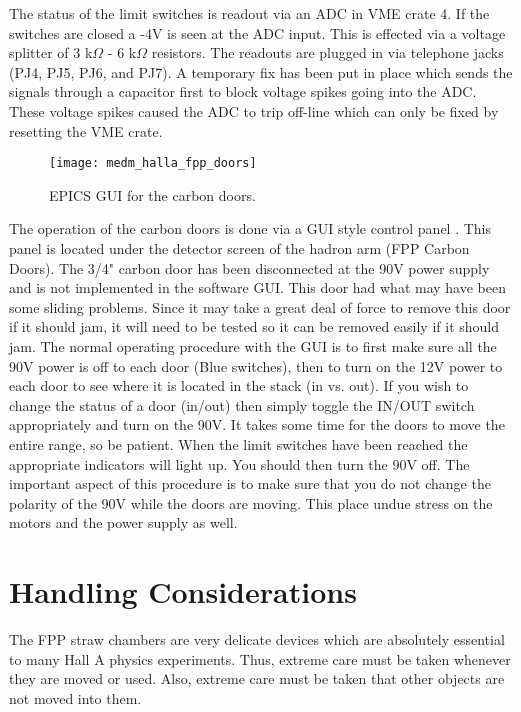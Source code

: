 {The status of the limit switches is readout via an ADC in VME crate
4. If the switches are closed a -4V is seen at the ADC input. This is
effected via a voltage splitter of 3 k$\Omega$ - 6 k$\Omega$ resistors. The
readouts are plugged in via telephone jacks (PJ4, PJ5, PJ6, and PJ7). A
temporary fix has been put in place which sends the signals through a
capacitor first to block voltage spikes going into the ADC. These
voltage spikes caused the ADC to trip off-line which can only be
fixed by resetting the VME crate.

\begin{figure}
\begin{center}
\texttt{[image: medm\_halla\_fpp\_doors]}
{\linespread{1.}
\caption[Detectors: FPP Carbon Door GUI]{EPICS GUI for the carbon doors.}
\label{fig:carbon_door_gui}}
\end{center}
\end{figure}

The operation of the carbon doors is done via a GUI style control
panel . This panel is located under the detector screen of the hadron
arm (FPP Carbon Doors). The 3/4" carbon door has been disconnected at
the 90V power supply and is not implemented in the software GUI. This
door had what may have been some sliding problems. Since it may take a
great deal of force to remove this door if it should jam, it will need
to be tested so it can be removed easily if it should jam. The normal
operating procedure with the GUI is to first
make sure all the 90V
power is off to each door (Blue switches), then to
turn on the 12V power to each door to see where it
is located in the stack (in vs.
out). If you wish to change the status of a door (in/out) then simply
toggle the IN/OUT switch appropriately and  turn on the 90V. It takes
some time for the doors to move the entire range, so be patient. When
the limit switches have been reached the appropriate indicators will
light up. You should then turn the 90V off. The important aspect of
this procedure is to make sure that you do not change the polarity of
the 90V while the doors are moving. This place undue stress on the
motors and the power supply as well.

\section{Handling Considerations}

The FPP straw chambers are very delicate devices which are absolutely
essential to many Hall A physics experiments.
Thus, extreme care must be taken whenever they are moved or used.
Also, extreme care must be taken that other objects are not moved
into them.

}
